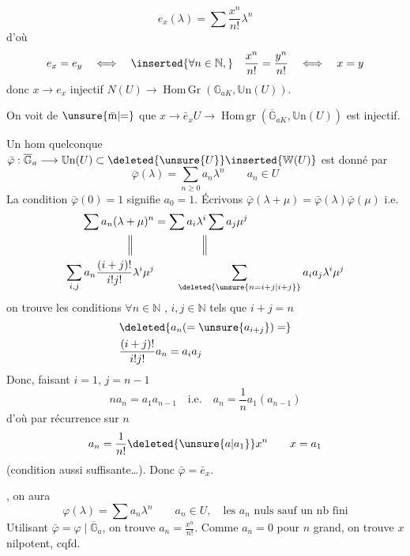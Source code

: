 \[
e_x(\lambda)=\sum\frac{x^n}{n!}\lambda^n
\]
d'où
\[
e_x=e_y\quad\Longleftrightarrow\quad\inserted{\forall n\in\mathbb N,}\quad
\frac{x^n}{n!}=\frac{y^n}{n!}\quad\Longleftrightarrow\quad x=y
\]
donc $x\longrightarrow e_x$ injectif \quad $N(U)\longrightarrow\operatorname{Hom\,Gr}(\mathbb G_{aK},\mathbb U\mathrm n(U))$.

On voit de $\unsure{\bar{\mathrm m}|{=}}$ que $x\longrightarrow\bar e_x$\quad $U\longrightarrow\operatorname{Hom\,gr}(\overline{\mathbb G}_{aK},\mathbb U\mathrm n(U))$ est injectif.

Un hom quelconque  $\bar\varphi:\overline{\mathbb G}_a\longrightarrow\mathbb U\mathrm n(U)\subset\deleted{\unsure{U}}\inserted{\mathbb W(U)}$ est donné par
\[
\bar\varphi(\lambda)=\sum_{n\geq0}a_n\lambda^n\qquad a_n\in U
\]
La condition $\bar\varphi(0)=1$ signifie $a_0=1$. Écrivons $\bar\varphi(\lambda+\mu)=\bar\varphi(\lambda)\bar\varphi(\mu)$ i.e.
\[
\begin{aligned}
\sum a_n(\lambda+\mu)^n&=\sum a_i\lambda^i\sum a_j\mu^j\\
\Big\Vert\hspace{1.9em}&\hspace{4.3em}\Big\Vert\\
\sum_{i,j} a_n\frac{(i+j)!}{i!j!}\lambda^i\mu^j&\qquad
\sum_{\deleted{\unsure{n=i+j|i+j}}}a_i a_j\lambda^i\mu^j
\end{aligned}
\]
on trouve les conditions $\forall n\in\mathbb N$ , $i,j\in\mathbb N$ tels que $i+j=n$
\[
\begin{aligned}
&\deleted{a_n(=\unsure{a_{i+j}})=}\\
&\frac{(i+j)!}{i!j!}a_n=a_i a_j
\end{aligned}
\]
Donc, faisant $i=1$, $j=n-1$
\[
na_n=a_1a_{n-1}\quad\text{i.e.}\quad a_n=\frac1n a_1(a_{n-1})
\]
d'où par récurrence sur $n$
\[
a_n=\frac1{n!}\deleted{\unsure{a|a_1}}x^n\qquad x=a_1
\]
(condition aussi suffisante\ldots). Donc $\bar\varphi=\bar e_x$.

 , on aura 
\[
\varphi(\lambda)=\sum a_n\lambda^n\qquad a_n\in U,\quad\text{les } a_n\text{ nuls sauf un nb fini}
\]
Utilisant $\bar\varphi=\varphi\mid\overline{\mathbb G}_a$, on trouve $a_n=\frac{x^n}{n!}$. Comme $a_n=0$ pour $n$ grand, on trouve $x$ nilpotent, cqfd.

